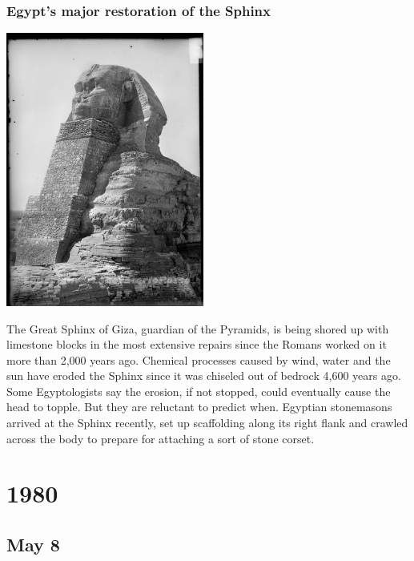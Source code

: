 \documentclass[11pt]{report}
\begin{document}
\subsection{Egypt's major restoration of the Sphinx}
\vspace{2mm}\begin{center}\includegraphics[width=6.5cm]{./img/sphinxRestoration.jpg}\end{center}
The Great Sphinx of Giza, guardian of the Pyramids, is being shored up with limestone blocks in the most extensive repairs since the Romans worked on it more than 2,000 years ago.
Chemical processes caused by wind, water and the sun have eroded the Sphinx since it was chiseled out of bedrock 4,600 years ago. Some Egyptologists say the erosion, if not stopped, could eventually cause the head to topple. But they are reluctant to predict when.
Egyptian stonemasons arrived at the Sphinx recently, set up scaffolding along its right flank and crawled across the body to prepare for attaching a sort of stone corset.

\chapter{1980}
\section{May 8}
\end{document}
